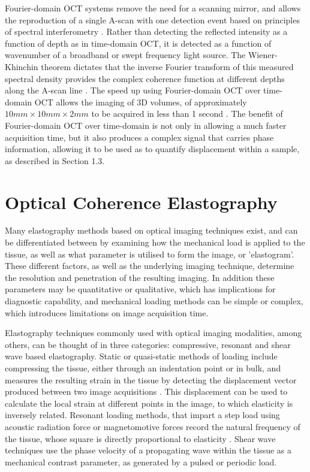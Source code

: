Fourier-domain OCT systems remove the need for a scanning mirror, and allows the reproduction of a single A-scan with one detection event based on principles of spectral interferometry \cite{chin_parametric_2016}. Rather than detecting the reflected intensity as a function of depth as in time-domain OCT, it is detected as a function of wavenumber of a broadband or swept frequency light source. The Wiener-Khinchin theorem dictates that the inverse Fourier transform of this measured spectral density provides the complex coherence function at different depths along the A-scan line \cite{schmitt_optical_1999}. The speed up using Fourier-domain OCT over time-domain OCT allows the imaging of 3D volumes, of approximately $10mm \times 10mm \times 2mm$ to be acquired in less than 1 second \cite{kennedy_emergence_2017}. The benefit of Fourier-domain OCT over time-domain is not only in allowing a much faster acquisition time, but it also produces a complex signal that carries phase information, allowing it to be used as to quantify displacement within a sample, as described in Section 1.3.

\section{Optical Coherence Elastography}
Many elastography methods based on optical imaging techniques exist, and can be differentiated between by examining how the mechanical load is applied to the tissue, as well as what parameter is utilised to form the image, or 'elastogram'. These different factors, as well as the underlying imaging technique, determine the resolution and penetration of the resulting imaging. In addition these parameters may be quantitative or qualitative, which has implications for diagnostic capability, and mechanical loading methods can be simple or complex, which introduces limitations on image acquisition time.

Elastography techniques commonly used with optical imaging modalities, among others, can be thought of in three categories: compressive, resonant and shear wave based elastography. Static or quasi-static methods of loading include compressing the tissue, either through an indentation point or in bulk, and measures the resulting strain in the tissue by detecting the displacement vector produced between two image acquisitions \cite{kennedy_optical_2014}. This displacement can be used to calculate the local strain at different points in the image, to which elasticity is inversely related. Resonant loading methods, that impart a step load using acoustic radiation force or magnetomotive forces record the natural frequency of the tissue, whose square is directly proportional to elasticity \cite{kennedy_optical_2015}. Shear wave techniques use the phase velocity of a propagating wave within the tissue as a mechanical contrast parameter, as generated by a pulsed or periodic load. 


